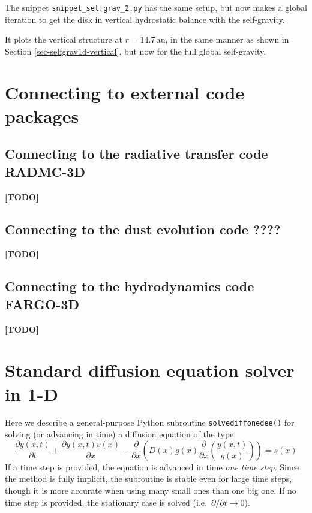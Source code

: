 \documentclass{book}
\newcommand{\code}[1]{{\small\tt #1}}
\begin{document}
The snippet \code{snippet\_selfgrav\_2.py} has the same setup, but now makes
a global iteration to get the disk in vertical hydrostatic balance with the
self-gravity. 
\begin{codebox}
\end{codebox}
It plots the vertical structure at $r=14.7\,\mathrm{au}$, in the same
manner as shown in Section \ref{sec-selfgrav1d-vertical}, but now for
the full global self-gravity. 


\newpage


\chapter{Connecting to external code packages}
\label{chap-links-to-external-codes}

\section{Connecting to the radiative transfer code {\sf RADMC-3D}}
\label{sec-connect-radmc-3d}

{\bf [TODO]}

\section{Connecting to the dust evolution code {\sf ????}}

{\bf [TODO]}

\section{Connecting to the hydrodynamics code {\sf FARGO-3D}}

{\bf [TODO]}


\appendix
\chapter{Standard diffusion equation solver in 1-D}
\label{sec-standard-diff-eq-solver-onedee}
Here we describe a general-purpose Python subroutine \code{solvediffonedee()}
for solving (or advancing in time) a diffusion equation of the type:
\begin{equation}\label{eq-standard-advection-diffusion}
  \frac{\partial y(x,t)}{\partial t} + \frac{\partial y(x,t)v(x)}{\partial x}
  - \frac{\partial}{\partial x}\left(D(x)g(x)
  \frac{\partial}{\partial x}\left(\frac{y(x,t)}{g(x)}\right)\right)=s(x)
\end{equation}
If a time step is provided, the equation is advanced in time {\em one time
  step}. Since the method is fully implicit, the subroutine is stable even for
large time steps, though it is more accurate when using many small ones than one
big one. If no time step is provided, the stationary case is solved
(i.e.~$\partial/\partial t\rightarrow 0$).
\end{document}
